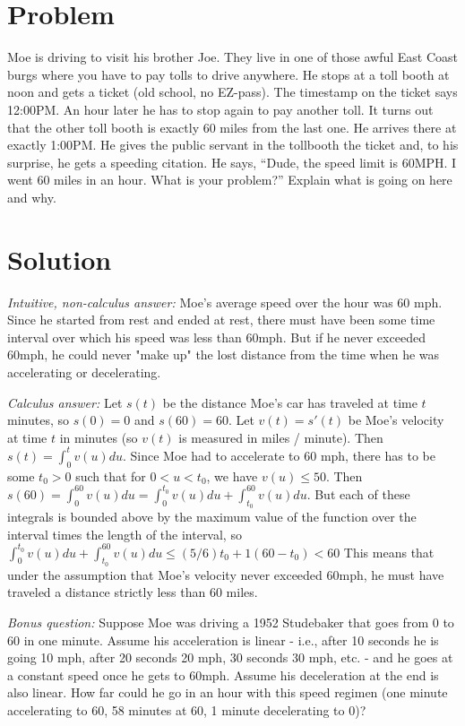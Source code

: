 \documentclass[11pt,a4paper]{report}
\theoremstyle{plain}
\theoremstyle{definition}
\theoremstyle{remark}
\begin{document}
	
\section*{Problem}
Moe is driving to visit his brother Joe.  They live in one of those awful East Coast burgs where you have to pay tolls to drive anywhere.  He stops at a toll booth at noon and gets a ticket (old school, no EZ-pass).  The timestamp on the ticket says 12:00PM.  An hour later he has to stop again to pay another toll.  It turns out that the other toll booth is exactly 60 miles from the last one.  He arrives there at exactly 1:00PM.  He gives the public servant in the tollbooth the ticket and, to his surprise, he gets a speeding citation. He says, “Dude, the speed limit is 60MPH. I went 60 miles in an hour.  What is your problem?”  Explain what is going on here and why.

\section*{Solution}
\textit{Intuitive, non-calculus answer:} Moe's average speed over the hour was 60 mph.  Since he started from rest and ended at rest, there must have been some time interval over which his speed was less than 60mph.  But if he never exceeded 60mph, he could never "make up" the lost distance from the time when he was accelerating or decelerating.

\textit{Calculus answer: } Let $s(t)$ be the distance Moe's car has traveled at time $t$ minutes, so $s(0) = 0$ and $s(60)= 60$.  Let $v(t) = s'(t)$ be Moe's velocity at time $t$ in minutes (so $v(t)$ is measured in miles / minute).  Then $s(t) = \int_{0}^{t} v(u) du$. Since Moe had to accelerate to 60 mph, there has to be some $t_0>0$ such that for $0 < u < t_0$, we have $v(u) \leq 50$.  Then $s(60) = \int_{0}^{60} v(u) du = \int_{0}^{t_0} v(u) du + \int_{t_0}^{60} v(u) du$.  But each of these integrals is bounded above by the maximum value of the function over the interval times the length of the interval, so $\int_{0}^{t_0} v(u) du + \int_{t_0}^{60} v(u) du \leq (5/6) t_0 + 1(60 - t_0) < 60$ This means that under the assumption that Moe's velocity never exceeded 60mph, he must have traveled a distance strictly less than 60 miles.

\textit{Bonus question: } Suppose Moe was driving a 1952 Studebaker that goes from 0 to 60 in one minute.  Assume his acceleration is linear - i.e., after 10 seconds he is going 10 mph, after 20 seconds 20 mph, 30 seconds 30 mph, etc. - and he goes at a constant speed once he gets to 60mph.  Assume his deceleration at the end is also linear. How far could he go in an hour with this speed regimen (one minute accelerating to 60, 58 minutes at 60, 1 minute decelerating to 0)?
\end{document}
